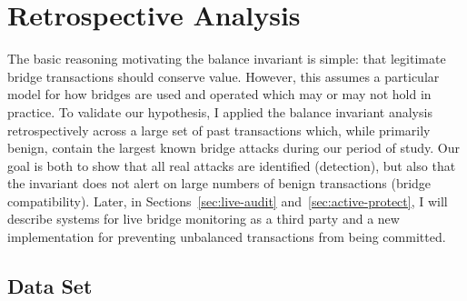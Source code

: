 \section{Retrospective Analysis}
\label{sec:retro-results}


The basic reasoning motivating the balance invariant is simple: that
legitimate bridge transactions should conserve value.  However, this
assumes a particular model for how bridges are used and operated which
may or may not hold in practice.  To validate our hypothesis, I applied
the balance invariant analysis retrospectively across a large set of
past transactions which, while primarily benign, contain the largest
known bridge attacks during our period of study.  Our goal is both to
show that all real attacks are identified (detection), but also that
the invariant does not alert on large numbers of benign transactions
(bridge compatibility).  Later, in Sections~\ref{sec:live-audit}
and~\ref{sec:active-protect}, I will describe systems for live bridge
monitoring as a third party and a new implementation for preventing
unbalanced transactions from being committed.



\subsection{Data Set}
\label{sec:retro-data}

